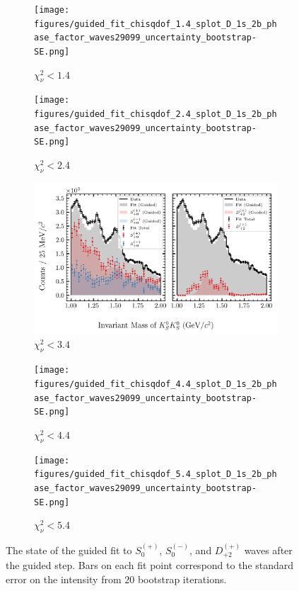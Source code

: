 \begin{figure}[htbp]
    \centering
    \begin{subfigure}{0.45\textwidth}
        \texttt{[image: figures/guided\_fit\_chisqdof\_1.4\_splot\_D\_1s\_2b\_phase\_factor\_waves29099\_uncertainty\_bootstrap-SE.png]}
        \caption{$\chi^2_\nu < 1.4$}
    \end{subfigure}
    \hfill
    \begin{subfigure}{0.45\textwidth}
        \texttt{[image: figures/guided\_fit\_chisqdof\_2.4\_splot\_D\_1s\_2b\_phase\_factor\_waves29099\_uncertainty\_bootstrap-SE.png]}
        \caption{$\chi^2_\nu < 2.4$}
    \end{subfigure}

    \vspace{1em}

    \begin{subfigure}{0.8\textwidth}
        \includegraphics[width=\linewidth]{figures/guided_fit_chisqdof_3.4_splot_D_1s_2b_phase_factor_waves29099_uncertainty_bootstrap-SE.png}
        \caption{$\chi^2_\nu < 3.4$}
    \end{subfigure}

    \vspace{1em}

    \begin{subfigure}{0.45\textwidth}
        \texttt{[image: figures/guided\_fit\_chisqdof\_4.4\_splot\_D\_1s\_2b\_phase\_factor\_waves29099\_uncertainty\_bootstrap-SE.png]}
        \caption{$\chi^2_\nu < 4.4$}
    \end{subfigure}
    \hfill
    \begin{subfigure}{0.45\textwidth}
        \texttt{[image: figures/guided\_fit\_chisqdof\_5.4\_splot\_D\_1s\_2b\_phase\_factor\_waves29099\_uncertainty\_bootstrap-SE.png]}
        \caption{$\chi^2_\nu < 5.4$}
    \end{subfigure}

    \caption{The state of the guided fit to $S_{0}^{(+)}$, $S_{0}^{(-)}$, and $D_{+2}^{(+)}$ waves after the guided step. Bars on each fit point correspond to the standard error on the intensity from $20$ bootstrap iterations.}
    \label{fig:guided-fit-all-Spn-D2p}
\end{figure}


